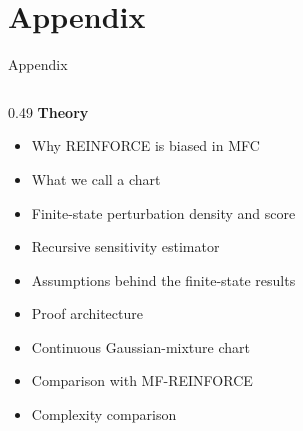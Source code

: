 \documentclass[9pt]{beamer}
\begin{document}
\appendix
\AtBeginSection[]{}
\section{Appendix}

\begin{frame}{Appendix}
\small
\begin{columns}[T]
\begin{column}{0.49\textwidth}
\textbf{Theory}
\begin{itemize}\scriptsize
  \item Why REINFORCE is biased in MFC
  \item What we call a chart
  \item Finite-state perturbation density and score
  \item Recursive sensitivity estimator
  \item Assumptions behind the finite-state results
  \item Proof architecture
  \item Continuous Gaussian-mixture chart
  \item Comparison with MF-REINFORCE
  \item Complexity comparison
\end{itemize}


\end{column}
\end{columns}
\end{frame}
\end{document}
